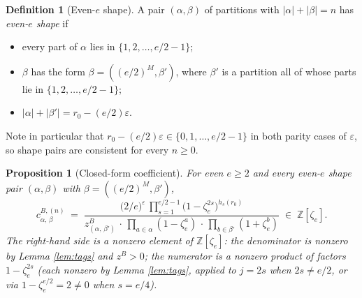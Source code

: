 \documentclass[11pt]{article}
\newtheorem{proposition}[theorem]{Proposition}
\theoremstyle{definition}
\newtheorem{definition}[theorem]{Definition}
\theoremstyle{remark}
\newcommand{\zetae}{\zeta_e}
\newcommand{\ZZ}{\mathbb{Z}}
\newcommand{\zB}{z^{B}}
\newcommand{\eps}{\varepsilon}
\begin{document}
\begin{definition}[Even-$e$ shape]\label{def:shape}
A pair $(\alpha, \beta)$ of partitions with $|\alpha| + |\beta| = n$ has \emph{even-$e$ shape} if
\begin{itemize}
  \item every part of $\alpha$ lies in $\{1, 2, \ldots, e/2 - 1\}$;
  \item $\beta$ has the form $\beta = ((e/2)^{M}, \beta')$, where $\beta'$ is a partition all of whose parts lie in $\{1, 2, \ldots, e/2 - 1\}$;
  \item $|\alpha| + |\beta'| = r_0 - (e/2)\eps$.
\end{itemize}
\end{definition}

Note in particular that $r_0 - (e/2)\eps \in \{0, 1, \ldots, e/2 - 1\}$ in both parity cases of $\eps$, so shape pairs are consistent for every $n \ge 0$.

\begin{proposition}[Closed-form coefficient]\label{prop:coeff}
For even $e \ge 2$ and every even-$e$ shape pair $(\alpha, \beta)$ with $\beta = ((e/2)^{M}, \beta')$,
\begin{equation}\label{eq:coeff-B-even}
  c^{B, (n)}_{\alpha,\, \beta}
  \;=\; \frac{\bigl(2/e\bigr)^{\eps}\, \prod_{s=1}^{e/2-1}\bigl(1 - \zetae^{2s}\bigr)^{h_s(r_0)}}{\zB_{(\alpha,\, \beta')}\, \cdot\, \prod_{a \in \alpha}(1 - \zetae^{a})\, \cdot\, \prod_{b \in \beta'}(1 + \zetae^{b})}
  \;\in\; \ZZ[\zetae].
\end{equation}
The right-hand side is a nonzero element of $\ZZ[\zetae]$: the denominator is nonzero by Lemma \ref{lem:tags} and $\zB > 0$; the numerator is a nonzero product of factors $1 - \zetae^{2s}$ (each nonzero by Lemma \ref{lem:tags}, applied to $j = 2s$ when $2s \ne e/2$, or via $1 - \zetae^{e/2} = 2 \ne 0$ when $s = e/4$).
\end{proposition}
\end{document}
